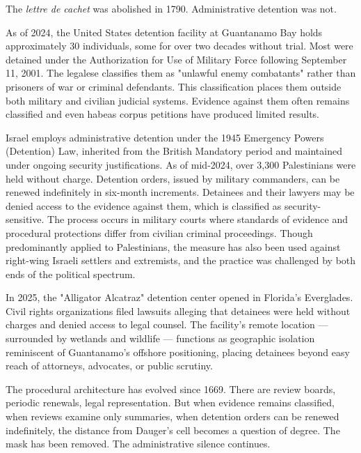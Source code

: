 \begin{commentary}
The \textit{lettre de cachet} was abolished in 1790. Administrative detention was not.

As of 2024, the United States detention facility at Guantanamo Bay holds approximately 30 individuals, some for over two decades without trial. Most were detained under the Authorization for Use of Military Force following September 11, 2001. The legalese classifies them as "unlawful enemy combatants" rather than prisoners of war or criminal defendants. This classification places them outside both military and civilian judicial systems. Evidence against them often remains classified and even habeas corpus petitions have produced limited results. 

Israel employs administrative detention under the 1945 Emergency Powers (Detention) Law, inherited from the British Mandatory period and maintained under ongoing security justifications. As of mid-2024, over 3,300 Palestinians were held without charge. Detention orders, issued by military commanders, can be renewed indefinitely in six-month increments. Detainees and their lawyers may be denied access to the evidence against them, which is classified as security-sensitive. The process occurs in military courts where standards of evidence and procedural protections differ from civilian criminal proceedings. Though predominantly applied to Palestinians, the measure has also been used against right-wing Israeli settlers and extremists, and the practice was challenged by both ends of the political spectrum.

In 2025, the "Alligator Alcatraz" detention center opened in Florida's Everglades. Civil rights organizations filed lawsuits alleging that detainees were held without charges and denied access to legal counsel. The facility's remote location — surrounded by wetlands and wildlife — functions as geographic isolation reminiscent of Guantanamo's offshore positioning, placing detainees beyond easy reach of attorneys, advocates, or public scrutiny.

The procedural architecture has evolved since 1669. There are review boards, periodic renewals, legal representation. But when evidence remains classified, when reviews examine only summaries, when detention orders can be renewed indefinitely, the distance from Dauger's cell becomes a question of degree. The mask has been removed. The administrative silence continues.
\end{commentary}
